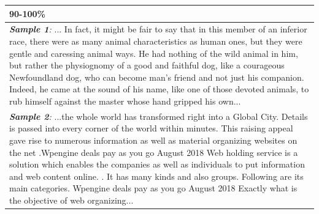 \documentclass[11pt]{article}
\begin{document}
\begin{longtable}{p{15cm}}
\midrule
\small \textbf{90-100\%} \\
\midrule
\small \textit{\textbf{Sample 1}:}  ... In fact, it might be fair to say that in this member of an inferior race, there were as many animal characteristics as human ones, but they were gentle and caressing animal ways. He had nothing of the wild animal in him, but rather the physiognomy of a good and faithful dog, like a courageous Newfoundland dog, who can become man's friend and not just his companion. Indeed, he came at the sound of his name, like one of those devoted animals, to rub himself against the master whose hand gripped his own... \\
\small \textit{\textbf{Sample 2}:} ...the whole world has transformed right into a Global City. Details is passed into every corner of the world within minutes. This raising appeal gave rise to numerous information as well as material organizing websites on the net .Wpengine deals pay as you go August 2018 Web holding service is a solution which enables the companies as well as individuals to put information and web content online. . It has many kinds and also groups. Following are its main categories. Wpengine deals pay as you go August 2018 Exactly what is the objective of web organizing...\\
\end{longtable}
\end{document}
